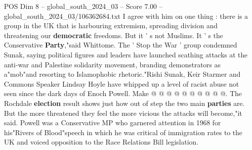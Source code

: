 \begin{textsample}{POS Dim 8 – global\_south\_2024\_03 – Score 7.00 – global\_south\_2024\_03/106362684.txt}
I agree with him on one thing : there is a group in the UK that is harbouring extremism, spreading division and threatening our \textbf{democratic} freedoms.
But it ' s not Muslims.
It ' s the Conservative \textbf{Party},"said Whittome.
The ' Stop the War ' group condemned Sunak, saying political figures and leaders have launched scathing attacks at the anti-war and Palestine solidarity movement, branding demonstrators as a"mob"and resorting to Islamophobic rhetoric."Rishi Sunak, Keir Starmer and Commons Speaker Lindsay Hoyle have whipped up a level of racist abuse not seen since the dark days of Enoch Powell.
Make @ @ @ @ @ @ @ @ @ @.
The Rochdale \textbf{election} result shows just how out of step the two main \textbf{parties} are.
But the more threatened they feel the more vicious the attacks will become,"it said.
Powell was a Conservative MP who garnered attention in 1968 for his"Rivers of Blood"speech in which he was critical of immigration rates to the UK and voiced opposition to the Race Relations Bill legislation.

\end{textsample}

